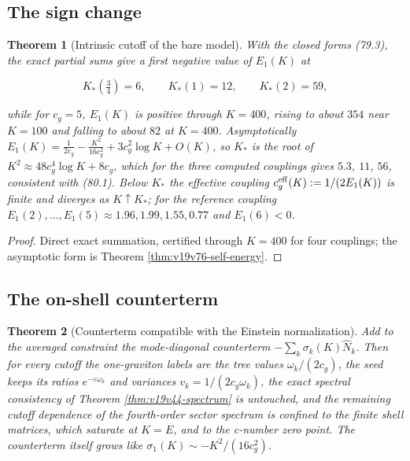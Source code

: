 \documentclass[11pt]{article}
\newtheorem{theorem}{Theorem}[section]
\theoremstyle{remark}
\begin{document}
\subsection{The sign change}

\begin{theorem}[Intrinsic cutoff of the bare model]
\label{thm:v19v77-cutoff}
With the closed forms (79.3), the exact partial sums give a first
negative value of \(E_1(K)\) at

\[
 K_*(\tfrac34)=6,\qquad K_*(1)=12,\qquad K_*(2)=59,                     \tag{80.1}
\]

while for \(c_g=5\), \(E_1(K)\) is positive through \(K=400\), rising
to about \(354\) near \(K=100\) and falling to about \(82\) at
\(K=400\).  Asymptotically \(E_1(K)=\tfrac1{2c_g}-\tfrac{K^2}{16c_g^2}+3c_g^2\log K+O(K)\),
so \(K_*\) is the root of \(K^2\approx48c_g^4\log K+8c_g\), which for
the three computed couplings gives \(5.3\), \(11\), \(56\), consistent
with (80.1).  Below \(K_*\) the effective coupling
\(c_g^{\rm eff}(K):=1/(2E_1(K))\) is finite and diverges as
\(K\uparrow K_*\); for the reference coupling
\(E_1(2),\dots,E_1(5)\approx1.96,1.99,1.55,0.77\) and
\(E_1(6)<0\).
\end{theorem}

\begin{proof}
Direct exact summation, certified through \(K=400\) for four
couplings; the asymptotic form is Theorem
\ref{thm:v19v76-self-energy}.
\end{proof}

\subsection{The on-shell counterterm}

\begin{theorem}[Counterterm compatible with the Einstein normalization]
\label{thm:v19v77-counterterm}
Add to the averaged constraint the mode-diagonal counterterm
\(-\sum_k\sigma_k(K)\widehat N_k\).  Then for every cutoff the
one-graviton labels are the tree values \(\omega_k/(2c_g)\), the seed
keeps its ratios \(e^{-\varepsilon\omega_k}\) and variances
\(v_k=1/(2c_g\omega_k)\), the exact spectral consistency of Theorem
\ref{thm:v19v44-spectrum} is untouched, and the remaining cutoff
dependence of the fourth-order sector spectrum is confined to the
finite shell matrices, which saturate at \(K=E\), and to the c-number
zero point.  The counterterm itself grows like
\(\sigma_1(K)\sim-K^2/(16c_g^2)\).
\end{theorem}
\end{document}
